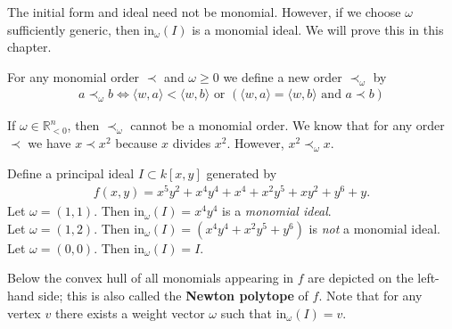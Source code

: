 \documentclass[a4paper, 11pt]{article}
\begin{document}
\begin{remark}
  The initial form and ideal need not be monomial. However, if we choose \( \omega \) sufficiently generic, then \( \mathrm{in}_\omega (I) \) is a {monomial ideal}. We will prove this in this chapter.
\end{remark}

\begin{defi}
  For any monomial order \( \prec \) and \( \omega \geq 0 \) we define a new order \( \prec_\omega \) by 
  \begin{align*}
    a \prec_\omega b \iff \langle w, a \rangle < \langle w, b \rangle \text{ or } (\langle w, a \rangle = \langle w, b \rangle \text{ and } a \prec b)
  \end{align*}
\end{defi}

\begin{remark}
  If \( \omega \in \mathbb R^n_{< 0} \), then \( \prec_\omega \) cannot be a monomial order. We know that for any order \( \prec \) we have \( x \prec x^2 \) because \( x \) divides \( x^2 \). However, \( x^2  \prec_\omega x \).
\end{remark}

\begin{eg}
  Define a principal ideal \( I \subset k[x,y] \) generated by 
  \begin{align*}
    f(x,y) = x^5y^2 + x^4y^4 + x^4 + x^2y^5 + xy^2 + y^6 + y.
  \end{align*}
  Let \( \omega = (1,1) \). Then \( \mathrm{in}_\omega(I) = x^4 y^4 \) is a \emph{monomial ideal}.\\
  Let \( \omega = (1,2) \). Then \( \mathrm{in}_\omega(I) = (x^4y^4 + x^2y^5 + y^6) \) is \emph{not} a monomial ideal.\\
  Let \( \omega = (0,0) \). Then \( \mathrm{in}_\omega(I) = I \).

  Below the convex hull of all monomials appearing in \( f \) are depicted on the left-hand side; this is also called the \textbf{Newton polytope} of \( f \). Note that for any vertex \( v \) there exists a weight vector \( \omega \) such that \( \mathrm{in}_\omega (I) = v \).
\end{eg}
\end{document}
